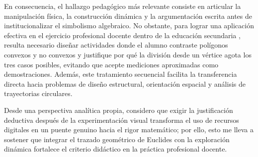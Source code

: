 \documentclass[spanish,letterpaper,oneside]{article}
\begin{document}
En consecuencia, el hallazgo pedagógico más relevante consiste en articular la manipulación física, la construcción dinámica y la argumentación escrita antes de institucionalizar el simbolismo algebraico. No obstante, para lograr una aplicación efectiva en el ejercicio profesional docente dentro de la educación secundaria \citep{sep2024_fase6}, resulta necesario diseñar actividades donde el alumno contraste polígonos convexos y no convexos y justifique por qué la división desde un vértice agota los tres casos posibles, evitando que acepte mediciones aproximadas como demostraciones. Además, este tratamiento secuencial facilita la transferencia directa hacia problemas de diseño estructural, orientación espacial y análisis de trayectorias circulares.

Desde una perspectiva analítica propia, considero que exigir la justificación deductiva después de la experimentación visual transforma el uso de recursos digitales en un puente genuino hacia el rigor matemático; por ello, esto me lleva a sostener que integrar el trazado geométrico de Euclides con la exploración dinámica fortalece el criterio didáctico en la práctica profesional docente.

\newsavebox{\hiddenbibbox}
\begin{lrbox}{\hiddenbibbox}\begin{minipage}{\textwidth}\end{minipage}\end{lrbox}
\end{document}
